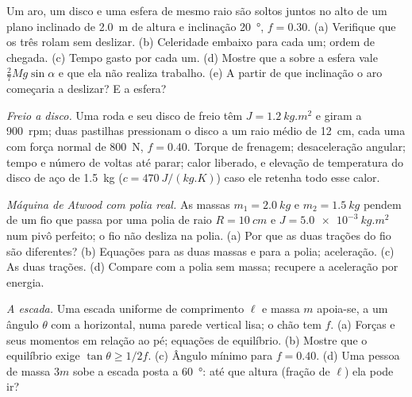 \begin{exercise}[$\star\star$]\label{exo:b2:rigid-body-mechanics:5}
Um aro, um disco e uma esfera de mesmo raio são soltos juntos no alto
de um plano inclinado de \qty{2.0}{m} de altura e inclinação \qty{20}{\degree}, $f =
0.30$. (a) Verifique que os três rolam sem deslizar. (b) Celeridade
embaixo para cada um; ordem de chegada. (c) Tempo gasto por cada um. (d) Mostre que
a  sobre a esfera vale $\tfrac27Mg\sin\alpha$ e que ela não realiza
trabalho. (e) A partir de que inclinação o aro começaria a deslizar? E a esfera?
\end{exercise}

\begin{exercise}[$\star\star$]\label{exo:b2:rigid-body-mechanics:6}
\emph{Freio a disco.} Uma roda e seu disco de freio têm $J = \qty{1.2}{kg.m^2}$
e giram a \qty{900}{rpm}; duas pastilhas pressionam o disco a um raio médio
de \qty{12}{cm}, cada uma com força normal de \qty{800}{N}, $f = 0.40$.
Torque de frenagem; desaceleração angular; tempo e número de voltas até parar;
calor liberado, e elevação de temperatura do disco de aço de \qty{1.5}{kg}
($c = \qty{470}{J/(kg.K)}$) caso ele retenha todo esse calor.
\end{exercise}

\begin{exercise}[$\star\star$]\label{exo:b2:rigid-body-mechanics:7}
\emph{Máquina de Atwood com polia real.} As massas $m_1 = \qty{2.0}{kg}$
e $m_2 = \qty{1.5}{kg}$ pendem de um fio que passa por uma polia de raio $R =
\qty{10}{cm}$ e  $J = \qty{5.0e-3}{kg.m^2}$ num
pivô perfeito; o fio não desliza na polia. (a) Por que as duas
trações do fio são diferentes? (b) Equações para as duas massas e para a
polia; aceleração. (c) As duas trações. (d) Compare com a polia sem
massa; recupere a aceleração por energia.
\end{exercise}

\begin{exercise}[$\star\star$]\label{exo:b2:rigid-body-mechanics:8}
\emph{A escada.} Uma escada uniforme de comprimento $\ell$ e massa $m$ apoia-se,
a um ângulo $\theta$ com a horizontal, numa parede vertical lisa;
o chão tem  $f$. (a) Forças e seus momentos
em relação ao pé; equações de equilíbrio. (b) Mostre que o equilíbrio exige
$\tan\theta \ge 1/2f$. (c) Ângulo mínimo para $f = 0.40$. (d) Uma pessoa de
massa $3m$ sobe a escada posta a \qty{60}{\degree}: até que altura (fração
de $\ell$) ela pode ir?
\end{exercise}

